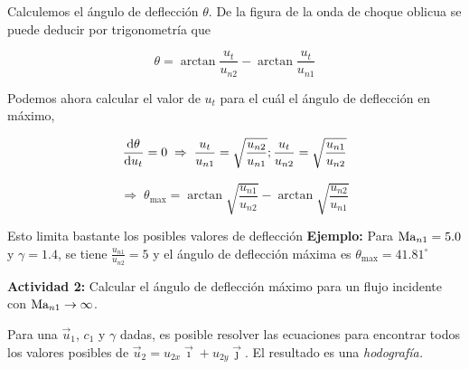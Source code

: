 	
	Calculemos el ángulo de deflección $\theta$. De la figura de la onda
	de choque oblicua se puede deducir por trigonometría que 
	
	
\begin{equation}
		\theta=\arctan\frac{u_{t}}{u_{n2}}-\arctan\frac{u_{t}}{u_{n1}}
\end{equation}
	
	
	Podemos ahora calcular el valor de $u_{t}$ para el cuál el ángulo
	de deflección en máximo,
	
	\begin{equation}
		\frac{\text{d}\theta}{\text{d} u_{t}}=0\;\Rightarrow\;\frac{u_{t}}{u_{n1}}=\sqrt{\frac{u_{n2}}{u_{n1}}};\frac{u_{t}}{u_{n2}}=\sqrt{\frac{u_{n1}}{u_{n2}}}
	\end{equation}
	
	
	
	\begin{equation}
		\Rightarrow\;\theta_{\textrm{max}}=\arctan\sqrt{\frac{u_{n1}}{u_{n2}}}-\arctan\sqrt{\frac{u_{n2}}{u_{n1}}}
	\end{equation}
	
	
	Esto limita bastante los posibles valores de deflección
	\textbf{Ejemplo:}
		Para $\text{Ma}_{n1}=5.0$ y $\gamma=1.4$, se tiene $\frac{u_{n1}}{u_{n2}}=5$
		y el ángulo de deflección máxima es $\theta_{\textrm{max}}=41.81^{\circ}$


	
	\textbf{Actividad 2:} Calcular el ángulo de deflección máximo para un flujo incidente con
		$\text{Ma}_{n1}\rightarrow\infty$.

	Para una $\vec{u}_{1}$, $c_{1}$ y $\gamma$ dadas, es posible resolver
	las ecuaciones para encontrar todos los valores posibles de $\vec{u}_{2}=u_{2x}\vec{\imath}+u_{2y}\vec{\jmath}$.
	El resultado es una \emph{hodografía.}
	
	\begin{center}
		\par\end{center}
	

